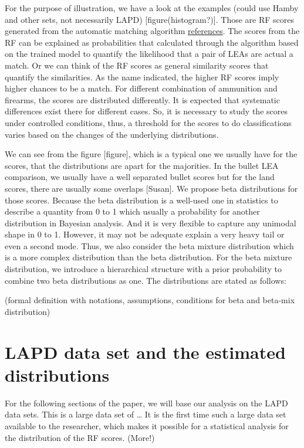 \documentclass[]{elsarticle} %
\begin{document}
For the purpose of illustration, we have a look at the examples (could
use Hamby and other sets, not necessarily LAPD)
{[}figure(histogram?){]}. Those are RF scores generated from the
automatic matching algorithm \protect\hyperlink{references}{references}.
The scores from the RF can be explained as probabilities that calculated
through the algorithm based on the trained model to quantify the
likelihood that a pair of LEAs are actual a match. Or we can think of
the RF scores as general similarity scores that quantify the
similarities. As the name indicated, the higher RF scores imply higher
chances to be a match. For different combination of ammunition and
firearms, the scores are distributed differently. It is expected that
systematic differences exist there for different cases. So, it is
necessary to study the scores under controlled conditions, thus, a
threshold for the scores to do classifications varies based on the
changes of the underlying distributions.

We can see from the figure {[}figure{]}, which is a typical one we
usually have for the scores, that the distributions are apart for the
majorities. In the bullet LEA comparison, we usually have a well
separated bullet scores but for the land scores, there are usually some
overlaps {[}Susan{]}. We propose beta distributions for those scores.
Because the beta distribution is a well-used one in statistics to
describe a quantity from 0 to 1 which usually a probability for another
distribution in Bayesian analysis. And it is very flexible to capture
any unimodal shape in 0 to 1. However, it may not be adequate explain a
very heavy tail or even a second mode. Thus, we also consider the beta
mixture distribution which is a more complex distribution than the beta
distribution. For the beta mixture distribution, we introduce a
hierarchical structure with a prior probability to combine two beta
distributions as one. The distributions are stated as follows:

(formal definition with notations, assumptions, conditions for beta and
beta-mix distribution)

\hypertarget{lapd-data-set-and-the-estimated-distributions}{%
\section{LAPD data set and the estimated
distributions}\label{lapd-data-set-and-the-estimated-distributions}}

For the following sections of the paper, we will base our analysis on
the LAPD data sets. This is a large data set of \ldots{} It is the first
time such a large data set available to the researcher, which makes it
possible for a statistical analysis for the distribution of the RF
scores. (More!)
\end{document}
